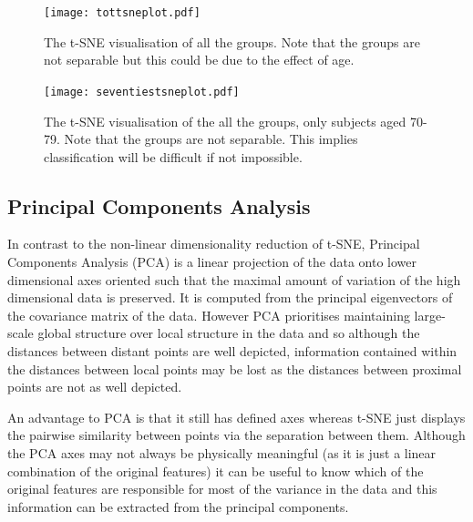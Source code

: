 \begin{figure}[h!]
  \centering
    \texttt{[image: tottsneplot.pdf]}
    \caption{The t-SNE visualisation of all the groups. Note that the groups are not separable but this could be due to the effect of age.}
    \label{fig:tottsneplot}
\end{figure}


\begin{figure}[h!]
  \centering
    \texttt{[image: seventiestsneplot.pdf]}
    \caption{The t-SNE visualisation of the all the groups, only subjects aged 70-79. Note that the groups are not separable. This implies classification will be difficult if not impossible.}
    \label{fig:seventiestsneplot}
\end{figure}



\subsection{Principal Components Analysis}

In contrast to the non-linear dimensionality reduction of t-SNE, Principal Components Analysis (PCA) is a linear projection of the data onto lower dimensional axes oriented such that the maximal amount of variation of the high dimensional data is preserved. \cite{Bushati2011} It is computed from the principal eigenvectors of the covariance matrix of the data. However PCA prioritises maintaining large-scale global structure over local structure in the data and so although the distances between distant points are well depicted, information contained within the distances between local points may be lost as the distances between proximal points are not as well depicted.

An advantage to PCA is that it still has defined axes whereas t-SNE just displays the pairwise similarity between points via the separation between them. Although the PCA axes may not always be physically meaningful (as it is just a linear combination of the original features) it can be useful to know which of the original features are responsible for most of the variance in the data and this information can be extracted from the principal components.


